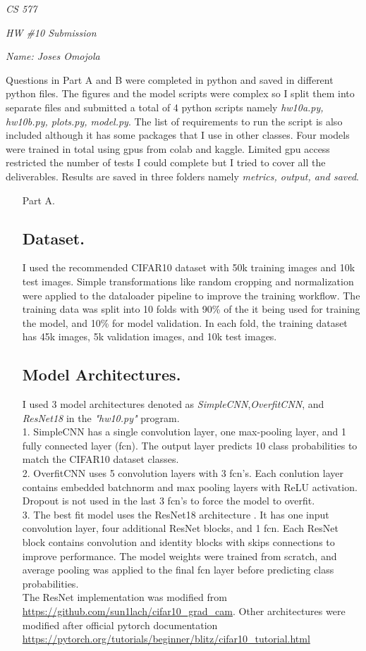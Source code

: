 \documentclass[12pt]{report}
\begin{document}
\centerline{\it CS 577}
\centerline{\it HW \#10 Submission}
\centerline{\it Name: Joses Omojola}

Questions in Part A and B were completed in python and saved in different python files. The figures and the model scripts were complex so I split them into separate files 
and submitted a total of 4 python scripts namely \emph{hw10a.py, hw10b.py, plots.py, model.py}. The list of requirements to run the script is also included although it has 
some packages that I use in other classes. Four models were trained in total using gpus from colab and kaggle. Limited gpu access restricted the number of tests I could 
complete but I tried to cover all the deliverables. Results are saved in three folders namely \emph{metrics, output, and saved}.

\begin{enumerate}
    \item[Part A.]
    \subsection*{Dataset.}
    I used the recommended CIFAR10 dataset with 50k training images and 10k test images. Simple transformations like random cropping and normalization were applied to the dataloader 
    pipeline to improve the training workflow. The training data was split into 10 folds with 90\% of the it being used for training the model, and 10\% for model validation. In 
    each fold, the training dataset has 45k images, 5k validation images, and 10k test images.
    \subsection*{Model Architectures.}
    I used 3 model architectures denoted as \emph{SimpleCNN},\emph{OverfitCNN}, and \emph{ResNet18} in the \emph{"hw10.py"} program.  \\
    1. SimpleCNN has a single convolution layer, one max-pooling layer, and 1 fully connected layer (fcn). The output layer predicts 10 class probabilities to match the 
    CIFAR10 dataset classes.  \\
    2. OverfitCNN uses 5 convolution layers with 3 fcn's. Each conlution layer contains embedded batchnorm and max pooling layers with ReLU activation. Dropout is not 
    used in the last 3 fcn's to force the model to overfit. \\
    3. The best fit model uses the ResNet18 architecture \cite{he2015deepresiduallearningimage}. It has one input convolution layer, four additional ResNet blocks, and 1 fcn. 
    Each ResNet block contains convolution and identity blocks with skips connections to improve performance. The model weights were trained from scratch, and average pooling 
    was applied to the final fcn layer before predicting class probabilities. \\
    The ResNet implementation was modified from \url{https://github.com/sun1lach/cifar10_grad_cam}. Other architectures were modified after official pytorch documentation 
    \url{https://pytorch.org/tutorials/beginner/blitz/cifar10_tutorial.html}

\end{enumerate}
\end{document}
